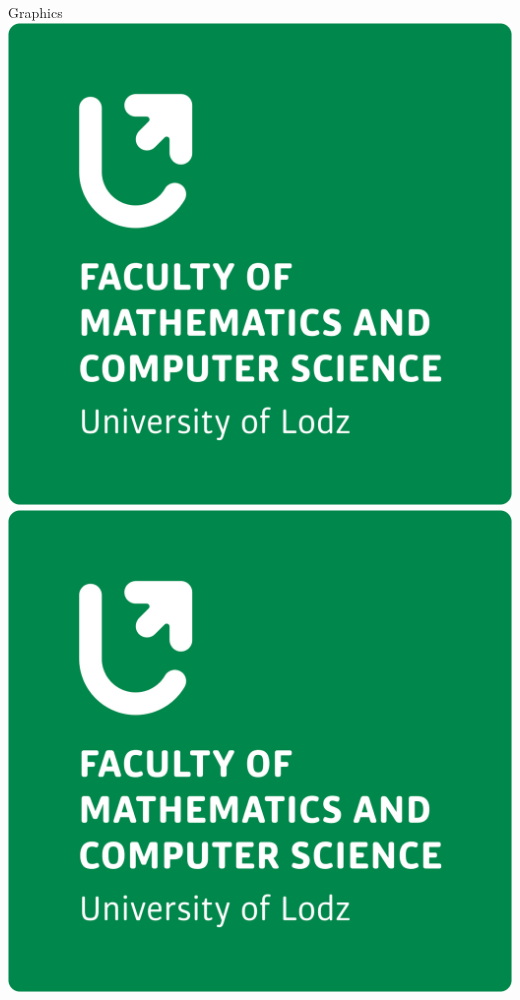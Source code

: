 \documentclass[hyperref={pdfpagemode=FullScreen}]{beamer}
\begin{document}
\begin{frame}{Graphics}
\includegraphics[scale=.05]{logo.jpg}\qquad \includegraphics[scale=.05]{logo.jpg}
\end{frame}
\end{document}
